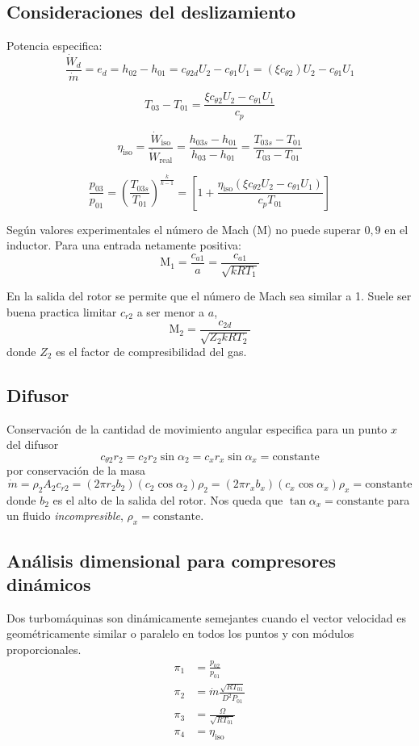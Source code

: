 \documentclass{article}
\newcommand{\substy}[2]{\ensuremath{{#1_{\mathrm{#2}}}}}
\newcommand{\cp}{c_p}
\newcommand{\gasconst}{k}
\newcommand{\ctegas}{\gasconst}
\newcommand{\speedsound}{a}
\newcommand{\ctan}[1]{\ensuremath{c_{\theta #1}}}
\newcommand{\crad}[1]{\ensuremath{c_{r #1}}}
\newcommand{\cax}[1]{\ensuremath{c_{a #1}}}
\newcommand{\Mach}{\textrm{M}}
\newcommand{\cte}{\textrm{constante}}
\newcommand{\etaiso}{\eta_{\mathrm{iso}}}
\newcommand{\dW}{\dot{W}}
\newcommand{\dm}{\dot{m}}
\newcommand{\etaTot}{\substy{\eta}{iso}}
\newcommand{\slip}{\xi}
\begin{document}
\subsection{Consideraciones del deslizamiento}
Potencia especifica:
\[
\frac{\dW_d}{\dm}=e_d = h_{02}-h_{01}=\ctan{2d} U_2 - \ctan{1} U_1 = (\slip \ctan{2})U_2 - \ctan{1} U_1
\]

\[
T_{03}-T_{01} = \frac{\slip \ctan{2}U_2-\ctan{1}U_1}{\cp}
\]

\[
\etaiso = \frac{\dW_{\mathrm{iso}}}{\dW_{\mathrm{real}}} = \frac{h_{03s}-h_{01}}{h_{03}-h_{01}}= \frac{T_{03s}-T_{01}}{T_{03}-T_{01}}
\]

\[
\frac{p_{03}}{p_{01}}= \left( \frac{T_{03s}}{T_{01}}\right)^{\frac{\ctegas}{\ctegas-1}} =\left[ 1+ \frac{\etaiso (\slip \ctan{2}U_2 - \ctan{1}U_1)}{\cp T_{01}} \right]
\]

Según valores experimentales el número de Mach ($\Mach$) no puede superar $0,9$ en el inductor. Para una entrada netamente positiva:
\[
\Mach_1 = \frac{\cax{1}}{\speedsound} = \frac{\cax{1}}{\sqrt{\ctegas R T_1}}
\]

En la salida del rotor se permite que el número de Mach sea similar a 1. Suele ser buena practica limitar $\crad{2}$ a ser menor a $\speedsound$,
\[
\Mach_2 = \frac{c_{2d}}{\sqrt{Z_2\ctegas R T_2}}
\]
donde $Z_2$ es el factor de compresibilidad del gas.


\subsection{Difusor}
\newcommand{\equis}{{\ensuremath{x}}}
Conservación de la cantidad de movimiento angular especifica para un punto \equis{} del difusor 
\[
\ctan{2} r_2 = c_2 r_2 \sin \alpha_2= c_\equis r_\equis \sin \alpha_\equis  = \cte
\]
por conservación de la masa
\[
\dm = \rho_2 A_2 \crad{2}  = (2\pi r_2 b_2 )(c_2 \cos \alpha_2) \rho_2 = (2\pi r_\equis b_\equis )(c_\equis \cos \alpha_\equis) \rho_\equis =\cte 
\]
donde $b_2$ es el alto de la salida del rotor. Nos  queda que $\tan \alpha_\equis=\cte$ para un fluido \textit{incompresible}, $\rho_\equis = \cte$.
\subsection{Análisis dimensional para compresores dinámicos}
Dos turbomáquinas son dinámicamente semejantes cuando el vector velocidad es geométricamente similar o paralelo en todos los puntos y con módulos proporcionales.
\begin{align}
    \pi_1 &= \frac{p_{02}}{p_{01}}\\
    \pi_2 &= \dm\frac{\sqrt{R T_{01}}}{D^2 P_{01}}\\
    \pi_3 &= \frac{\Omega}{\sqrt{RT_{01}}}\\
    \pi_4 &= \etaTot
\end{align}
\end{document}
